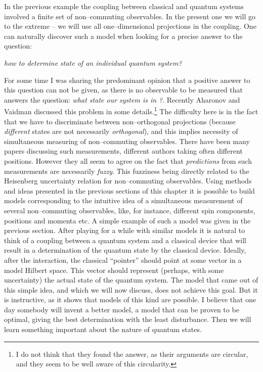\documentclass[12pt]{article}
\begin{document}
In the previous example the coupling between classical and quantum
systems involved a finite set of non--commuting observables.  In the
present one we will go to the extreme -- we will use { all}
one--dimensional projections in the coupling.  One can naturally discover
such a model when looking for a precise answer to the question: 
\begin{center} {\sl how
to determine state of an individual quantum system?}
\end{center}
For some time I was sharing the predominant opinion
 that a positive answer to this question can
not be given,  as there is no observable to be measured that answers the
question:  {\sl what state our system is in ?}.  Recently Aharonov and
Vaidman
\cite{aha} discussed this problem in some details.\footnote{I do not
think that they found the answer,  as their arguments 
are circular,  and they seem to be well aware of this circularity. } 
The
difficulty here is in the fact that we have to discriminate between
non--orthogonal projections  (because {\sl different} states are not
necessarily {\sl orthogonal}),  and this implies necessity of 
simultaneous measuring
of non--commuting observables.  There have been many papers discussing
such measurements,  different authors taking often different positions.  
However they all seem to agree on  the fact that {\sl
predictions} from such measurements are necessarily {\sl fuzzy}.  
This fuzziness
being directly related to the Heisenberg uncertainty relation for
non--commuting observables.  Using methods and ideas presented 
in the previous 
sections of this chapter it is possible to build
models corresponding to the intuitive idea of a simultaneous
measurement of several non--commuting observables,  like,  for instance, 
 different spin components,  
positions {and}
momenta etc.  A simple example of such a model was given in the 
previous section.  
After playing for a while with similar models it is
natural to think of a coupling between a quantum system and a
classical device that will result in a determination of the quantum state
by the classical device.  Ideally,  after the interaction,  the classical
``pointer'' should point at some vector in a model
 Hilbert space.  This vector should
represent  (perhaps,  with some uncertainty) the actual state of the
quantum system.  The model that came out of this simple idea,  and which
we will now discuss,  does not achieve this goal.  But it is instructive, 
as it shows that models of this kind are possible.  I believe that one day
somebody will invent a better model,  a model that can be proven to be
optimal,  giving the best determination with the least disturbance.  Then
we will learn something important about the nature of quantum states. 
\end{document}
